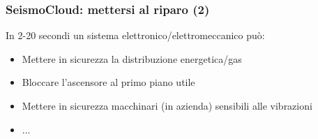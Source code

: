 \begin{frame}
	\frametitle{SeismoCloud: mettersi al riparo (2)}
	
	In 2-20 secondi un sistema elettronico/elettromeccanico può:
	\pause
	\begin{itemize}
		\item<2-> Mettere in sicurezza la distribuzione energetica/gas
		\item<3-> Bloccare l'ascensore al primo piano utile
		\item<4-> Mettere in sicurezza macchinari (in azienda) sensibili alle vibrazioni
		\item<5-> ...
	\end{itemize}
	
\end{frame}